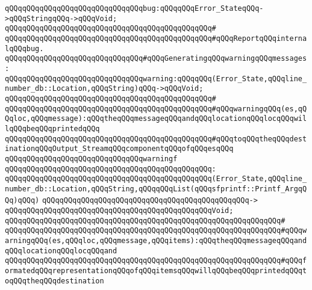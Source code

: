\newline
\newline
\newline
\verb|qQQqqQQqqQQqqQQqqQQqqQQqqQQqqQQqbug:qQQqqQQqError_StateqQQq->qQQqStringqQQq->qQQqVoid;|\newline
\verb|qQQqqQQqqQQqqQQqqQQqqQQqqQQqqQQqqQQqqQQqqQQqqQQq#|\newline
\verb|qQQqqQQqqQQqqQQqqQQqqQQqqQQqqQQqqQQqqQQqqQQqqQQq#qQQqReportqQQqinternalqQQqbug.|\newline
\newline
\newline
\newline
\verb|qQQqqQQqqQQqqQQqqQQqqQQqqQQqqQQq#qQQqGeneratingqQQqwarningqQQqmessages:|\newline
\newline
\verb|qQQqqQQqqQQqqQQqqQQqqQQqqQQqqQQqwarning:qQQqqQQq(Error_State,qQQqline_number_db::Location,qQQqString)qQQq->qQQqVoid;|\newline
\verb|qQQqqQQqqQQqqQQqqQQqqQQqqQQqqQQqqQQqqQQqqQQqqQQq#|\newline
\verb|qQQqqQQqqQQqqQQqqQQqqQQqqQQqqQQqqQQqqQQqqQQqqQQq#qQQqwarningqQQq(es,qQQqloc,qQQqmessage):qQQqtheqQQqmessageqQQqandqQQqlocationqQQqlocqQQqwillqQQqbeqQQqprintedqQQq|\newline
\verb|qQQqqQQqqQQqqQQqqQQqqQQqqQQqqQQqqQQqqQQqqQQqqQQq#qQQqtoqQQqtheqQQqdestinationqQQqOutput_StreamqQQqcomponentqQQqofqQQqesqQQq|\newline
\newline
\verb|qQQqqQQqqQQqqQQqqQQqqQQqqQQqqQQqwarningf|\newline
\verb|qQQqqQQqqQQqqQQqqQQqqQQqqQQqqQQqqQQqqQQqqQQqqQQq:|\newline
\verb|qQQqqQQqqQQqqQQqqQQqqQQqqQQqqQQqqQQqqQQqqQQqqQQq(Error_State,qQQqline_number_db::Location,qQQqString,qQQqqQQqList(qQQqsfprintf::Printf_ArgqQQq)qQQq)|\newline
\verb|qQQqqQQqqQQqqQQqqQQqqQQqqQQqqQQqqQQqqQQqqQQqqQQq->|\newline
\verb|qQQqqQQqqQQqqQQqqQQqqQQqqQQqqQQqqQQqqQQqqQQqqQQqVoid;|\newline
\verb|qQQqqQQqqQQqqQQqqQQqqQQqqQQqqQQqqQQqqQQqqQQqqQQqqQQqqQQqqQQqqQQq#|\newline
\verb|qQQqqQQqqQQqqQQqqQQqqQQqqQQqqQQqqQQqqQQqqQQqqQQqqQQqqQQqqQQqqQQq#qQQqwarningqQQq(es,qQQqloc,qQQqmessage,qQQqitems):qQQqtheqQQqmessageqQQqandqQQqlocationqQQqlocqQQqand|\newline
\verb|qQQqqQQqqQQqqQQqqQQqqQQqqQQqqQQqqQQqqQQqqQQqqQQqqQQqqQQqqQQqqQQq#qQQqformatedqQQqrepresentationqQQqofqQQqitemsqQQqwillqQQqbeqQQqprintedqQQqtoqQQqtheqQQqdestination|\newline
